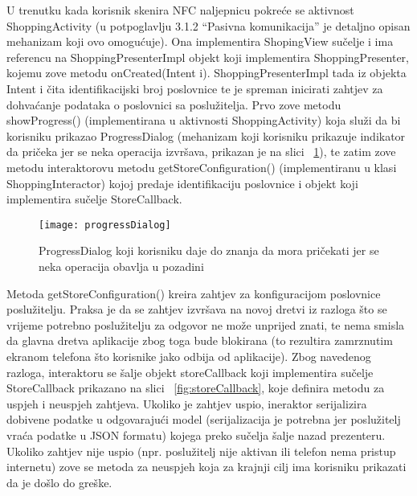 U trenutku kada korisnik skenira NFC naljepnicu pokre\'{c}e se aktivnost ShoppingActivity (u potpoglavlju 3.1.2 ``Pasivna komunikacija'' je detaljno opisan mehanizam koji ovo omogu\'{c}uje). Ona implementira ShopingView su\v{c}elje i ima referencu na ShoppingPresenterImpl objekt koji implementira ShoppingPresenter, kojemu zove metodu onCreated(Intent i). ShoppingPresenterImpl tada iz objekta Intent i \v{c}ita identifikacijski broj poslovnice te je spreman inicirati zahtjev za dohva\'{c}anje podataka o poslovnici sa poslu\v{z}itelja. Prvo zove metodu showProgress() (implementirana u aktivnosti ShoppingActivity) koja slu\v{z}i da bi korisniku prikazao ProgressDialog (mehanizam koji korisniku prikazuje indikator da pri\v{c}eka jer se neka operacija izvr\v{s}ava, prikazan je na slici ~\ref{fig:progressDialog}), te zatim zove metodu interaktorovu metodu getStoreConfiguration() (implementiranu u klasi ShoppingInteractor) kojoj predaje identifikaciju poslovnice i objekt koji implementira su\v{c}elje StoreCallback.


\begin{figure}[!htbp]
	\begin{center}
 \texttt{[image: progressDialog]}
 \caption{ProgressDialog koji korisniku daje do znanja da mora pri\v{c}ekati jer se neka operacija obavlja u pozadini}
 \label{fig:progressDialog}
	\end{center}
\end{figure}

Metoda getStoreConfiguration() kreira zahtjev za konfiguracijom poslovnice poslu\v{z}itelju. Praksa je da se zahtjev izvr\v{s}ava na novoj dretvi iz razloga \v{s}to se vrijeme potrebno poslu\v{z}itelju za odgovor ne mo\v{z}e unprijed znati, te nema smisla da glavna dretva aplikacije zbog toga bude blokirana (to rezultira zamrznutim ekranom telefona \v{s}to korisnike jako odbija od aplikacije). Zbog navedenog razloga, interaktoru se \v{s}alje objekt storeCallback koji implementira su\v{c}elje StoreCallback prikazano na slici ~\ref{fig:storeCallback}, koje definira metodu za uspjeh i neuspjeh zahtjeva. Ukoliko je zahtjev uspio, ineraktor serijalizira dobivene podatke u odgovaraju\'{c}i model (serijalizacija je potrebna jer poslu\v{z}itelj vra\'{c}a podatke u JSON formatu) kojega preko su\v{c}elja \v{s}alje nazad prezenteru. Ukoliko zahtjev nije uspio (npr. poslu\v{z}itelj nije aktivan ili telefon nema pristup internetu) zove se metoda za neuspjeh koja za krajnji cilj ima korisniku prikazati da je do\v{s}lo do gre\v{s}ke.



